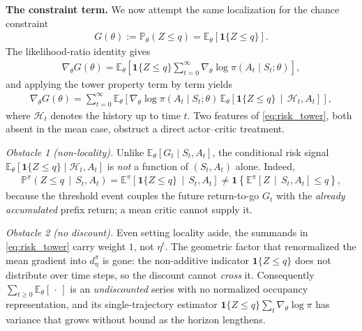 \textbf{The constraint term.} We now attempt the same localization for the chance constraint
\begin{align}
    G(\theta)
    :=
    \mathbb{P}_{\theta}(Z\le q)
    =
    \mathbb{E}_{\theta}\!\left[\mathbf{1}\{Z\le q\}\right].
\end{align}
The likelihood-ratio identity gives
\begin{align}
    \nabla_{\theta}G(\theta)
    =
    \mathbb{E}_{\theta}\!\left[
        \mathbf{1}\{Z\le q\}
        \sum_{t=0}^{\infty}\nabla_{\theta}\log\pi(A_t\mid S_t;\theta)
    \right],
\end{align}
and applying the tower property term by term yields
\begin{align}\label{eq:risk_tower}
    \nabla_{\theta}G(\theta)
    =
    \sum_{t=0}^{\infty}
    \mathbb{E}_{\theta}\!\left[
        \nabla_{\theta}\log\pi(A_t\mid S_t;\theta)\,
        \mathbb{E}_{\theta}\!\left[\mathbf{1}\{Z\le q\}\,\middle|\,\mathcal{H}_t,A_t\right]
    \right],
\end{align}
where $\mathcal{H}_t$ denotes the history up to time $t$. Two features of \eqref{eq:risk_tower}, both absent in the mean case, obstruct a direct actor--critic treatment.

\emph{Obstacle 1 (non-locality).} Unlike $\mathbb{E}_{\theta}[G_t\mid S_t,A_t]$, the conditional risk signal $\mathbb{E}_{\theta}[\mathbf{1}\{Z\le q\}\mid\mathcal{H}_t,A_t]$ is \emph{not} a function of $(S_t,A_t)$ alone. Indeed,
\begin{align}
    \mathbb{P}^{\pi}\!\left(Z\le q\,\middle|\,S_t,A_t\right)
    =
    \mathbb{E}^{\pi}\!\left[\mathbf{1}\{Z\le q\}\,\middle|\,S_t,A_t\right]
    \neq
    \mathbf{1}\!\left\{\mathbb{E}^{\pi}\!\left[Z\,\middle|\,S_t,A_t\right]\le q\right\},
\end{align}
because the threshold event couples the future return-to-go $G_t$ with the \emph{already accumulated} prefix return; a mean critic cannot supply it.

\emph{Obstacle 2 (no discount).} Even setting locality aside, the summands in \eqref{eq:risk_tower} carry weight $1$, not $\eta^t$. The geometric factor that renormalized the mean gradient into $d_{\eta}^{\pi}$ is gone: the non-additive indicator $\mathbf{1}\{Z\le q\}$ does not distribute over time steps, so the discount cannot \emph{cross} it. Consequently $\sum_{t\ge0}\mathbb{E}_{\theta}[\,\cdot\,]$ is an \emph{undiscounted} series with no normalized occupancy representation, and its single-trajectory estimator $\mathbf{1}\{Z\le q\}\sum_t\nabla_{\theta}\log\pi$ has variance that grows without bound as the horizon lengthens.

